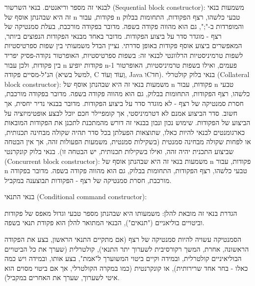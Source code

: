         לבנאי זה מספר וריאנטים.
        בנאי השרשור (Sequential block constructor):
        משמעות בנאי זה היא שבהנתן אוסף של n פקודות, עבור n טבעי כלשהו, רצף הפקודות, התחומות בבלוק והמופרדות ב-";", גם הוא מהווה פקודה בשפה. מדובר בפקודה מורכבת, בעלת סמנטיקה של רצף - מוגדר סדר על ביצוע הפקודות.
        מדובר באחד מבנאי הפקודות הנפוצים ביותר, המאפשרים ביצוע אוסף פקודות באופן סדרתי. נציין הבדל משמעותי בין שפות ספרטיסטיות לשפות טרמיניסטיות הרלוונטי לבנאי זה: בשפות ספרטיסטיות, האופרטור נקודה-פסיק יפריד בין פקודות, ולכן עבור n פקודות יופיע n-1 פעמים, ואילו בשפות טרמיניסטיות, האופרטור הנ"ל-מסיים פקודה (למשל בשיא, C וְעוֹד וְעוֹד, Java וCחד).
        בנאי בלוק קולטרלי (Collateral block constructor):
        משמעות בנאי זה היא שבהנתן אוסף של n פקודות, עבור n טבעי כלשהו, רצף הפקודות,
        התחומות בבלוק, גם הוא מהווה פקודה בשפה. מדובר בפקודה מורכבת, חסרת סמנטיקה של
        רצף - לא מוגדר סדר על ביצוע הפקודות. מדובר בבנאי נדיר יחסית, אך חשוב. סדר
        הביצוע אמנם לא דטרמיניסטי, אך קומפיילר חכם
        יוכל לבצע אופטימיזציה על הביצוע של הפקודות. שימוש נכון ונבון בבנאי זה דורש
        מהמתכנת לתכנן את הפקודות המובאות כארגומנטים לבנאי להיות כאלו, שתוצאות הפעלתן
        בכל סדר תהיה שקולה מבחינה תכנותית, או לפחות שקולה מבחינה סמנטית (בשקילות
        סמנטית, משמעות הפעולות זהה, אך אין הבטחה שביצוע התכנית יהיה זהה, ואילו בשקילות
        תכנותית, יש הבטחה זו). בנאי בלוק קונקרנטי (Concurrent block constructor):
        משמעות בנאי זה היא שבהנתן אוסף של n פקודות, עבור n טבעי כלשהו, רצף הפקודות, התחומות בבלוק, גם הוא מהווה פקודה בשפה. מדובר בפקודה מורכבת, חסרת סמנטיקה של רצף - הפקודות תבוצענה במקביל.

        בנאי התנאי (Conditional command constructor):

        הגדרת בנאי זה מובאת להלן:
        משמעותו היא שבהנתן מספר טבעי וגדול מאפס של פקודות וביטויים בוליאניים ("תנאים"), הבנאי המתואר להלן הוא פקודת תנאי בשפה.

        הסמנטיקה עשויה להיות סמנטיקה של רצף (אם מתקיים התנאי הראשון, בצע את הפקודה
        הראשונה, אחרת, המשך רקורסיבית לשערוך יתר התנאי), קולטרלית (שערך את כל הביטויים
        הבוליאיניים קולטרלית, ובמידה וקיים ביטוי המשוערך ל"אמת", בצע אותו, ובמידה ויש
        כמה כאלו - בחר אחד שרירותית), או קונקרנטית (כמו במקרה הקולטרלי, אך אם ביטוי
        מסוים הוא איטי לשערוך, שערך את האחרים במקביל).

